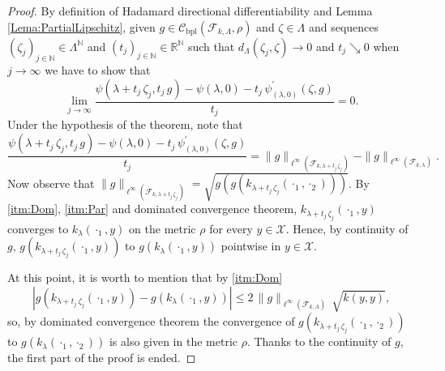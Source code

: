 			\begin{proof}
				By definition of Hadamard directional differentiability and Lemma \ref{Lema:PartialLipschitz}, given $g\in\mathcal{C}_{\operatorname{bpl}}\left(\mathcal{F}_{k,\Lambda},\rho\right)$ and $\zeta\in\Lambda$ and sequences $\left(\zeta_{j}\right)_{j\in\mathbb{N}}\in\Lambda^{\mathbb{N}}$ and $\left(t_{j}\right)_{j\in\mathbb{N}}\in\mathbb{R}^{\mathbb{N}}$ such that $d_{\Lambda}\left(\zeta_{j},\zeta\right)\longrightarrow0$ and $t_{j}\searrow0$ when $j\longrightarrow\infty$ we have to show that
				\begin{equation}
					\lim_{j\longrightarrow\infty}\frac{\psi\left(\lambda+t_{j}\,\zeta_{j},t_{j}\,g\right)-\psi(\lambda,0)-t_{j}\,\psi_{(\lambda,0)}^{\prime}\left(\zeta,g\right)}{t_{j}}=0.
				\end{equation}
				Under the hypothesis of the theorem, note that
				\begin{equation}
					\frac{\psi\left(\lambda+t_{j}\,\zeta_{j},t_{j}\,g\right)-\psi(\lambda,0)-t_{j}\,\psi_{(\lambda,0)}^{\prime}\left(\zeta,g\right)}{t_{j}}=\|g\|_{\ell^{\infty}\left(\mathcal{F}_{k,\lambda+t_{j}\,\zeta_{j}}\right)}-\|g\|_{\ell^{\infty}\left(\mathcal{F}_{k,\lambda}\right)}.
				\end{equation}
				Now observe that $\|g\|_{\ell^{\infty}\left(\mathcal{F}_{k,\lambda+t_{j}\,\zeta_{j}}\right)}=\sqrt{g\left(g\left(k_{\lambda+t_{j}\,\zeta_{j}}\left(\cdot_{1},\cdot_{2}\right)\right)\right)}$. By \ref{itm:Dom}, \ref{itm:Par} and dominated convergence theorem, $k_{\lambda+t_{j}\,\zeta_{j}}\left(\cdot_{1},y\right)$ converges to $k_{\lambda}\left(\cdot_{1},y\right)$ on the metric $\rho$ for every $y\in\mathcal{X}$. Hence, by continuity of $g$, $g\left(k_{\lambda+t_{j}\,\zeta_{j}}\left(\cdot_{1},y\right)\right)$ to $g\left(k_{\lambda}\left(\cdot_{1},y\right)\right)$ pointwise in $y\in\mathcal{X}$.
				
				At this point, it is worth to mention that by \ref{itm:Dom}
				\begin{equation}
					\left|g\left(k_{\lambda+t_{j}\,\zeta_{j}}\left(\cdot_{1},y\right)\right)-g\left(k_{\lambda}\left(\cdot_{1},y\right)\right)\right|\leq2\,\|g\|_{\ell^{\infty}\left(\mathcal{F}_{k,\Lambda}\right)}\,\sqrt{k(y,y)},
				\end{equation}
				so, by dominated convergence theorem the convergence of $g\left(k_{\lambda+t_{j}\,\zeta_{j}}\left(\cdot_{1},\cdot_{2}\right)\right)$ to $g\left(k_{\lambda}\left(\cdot_{1},\cdot_{2}\right)\right)$ is also given in the metric $\rho$. Thanks to the continuity of $g$, the first part of the proof is ended.
			\end{proof}
